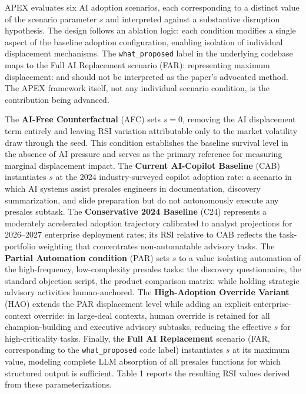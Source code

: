 \documentclass[10pt, conference]{IEEEtran}
\begin{document}
\label{sec:experimental_conditions_and_scenario_par}

APEX evaluates six AI adoption scenarios, each corresponding to a distinct value of the scenario parameter $s$ and interpreted against a substantive disruption hypothesis. The design follows an ablation logic: each condition modifies a single aspect of the baseline adoption configuration, enabling isolation of individual displacement mechanisms. The \texttt{what\_proposed} label in the underlying codebase maps to the Full AI Replacement scenario (FAR): representing maximum displacement: and should not be interpreted as the paper's advocated method. The APEX framework itself, not any individual scenario condition, is the contribution being advanced.

The \textbf{AI-Free Counterfactual} (AFC) sets $s = 0$, removing the AI displacement term entirely and leaving RSI variation attributable only to the market volatility draw through the seed. This condition establishes the baseline survival level in the absence of AI pressure and serves as the primary reference for measuring marginal displacement impact. The \textbf{Current AI-Copilot Baseline} (CAB) instantiates $s$ at the 2024 industry-surveyed copilot adoption rate: a scenario in which AI systems assist presales engineers in documentation, discovery summarization, and slide preparation but do not autonomously execute any presales subtask. The \textbf{Conservative 2024 Baseline} (C24) represents a moderately accelerated adoption trajectory calibrated to analyst projections for 2026--2027 enterprise deployment rates; its RSI relative to CAB reflects the task-portfolio weighting that concentrates non-automatable advisory tasks. The \textbf{Partial Automation condition} (PAR) sets $s$ to a value isolating automation of the high-frequency, low-complexity presales tasks: the discovery questionnaire, the standard objection script, the product comparison matrix: while holding strategic advisory activities human-anchored. The \textbf{High-Adoption Override Variant} (HAO) extends the PAR displacement level while adding an explicit enterprise-context override: in large-deal contexts, human override is retained for all champion-building and executive advisory subtasks, reducing the effective $s$ for high-criticality tasks. Finally, the \textbf{Full AI Replacement} scenario (FAR, corresponding to the \texttt{what\_proposed} code label) instantiates $s$ at its maximum value, modeling complete LLM absorption of all presales functions for which structured output is sufficient. Table 1 reports the resulting RSI values derived from these parameterizations.
\end{document}
